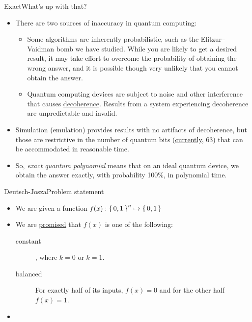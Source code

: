\begin{frame}{Exact}{What's up with that?}
\begin{itemize}[<+->]
    \item There are two sources of inaccuracy in quantum computing:
    \begin{itemize}
        \item Some algorithms are inherently probabilistic, such as the Elitzur--Vaidman bomb we have studied. While you are likely to get a desired result, it may take effort to overcome the probability of obtaining the wrong answer, and it is possible though very unlikely that you cannot obtain the answer.
        \item Quantum computing devices are subject to noise and other interference that causes \href{https://en.wikipedia.org/wiki/Quantum_decoherence}{decoherence}.  Results from a system experiencing decoherence are unpredictable and invalid.
    \end{itemize}
    \item Simulation (emulation) provides results with no artifacts of decoherence, but those are restrictive in the number of quantum bits (\href{https://qiskit.org/documentation/tutorials/simulators/6_extended_stabilizer_tutorial.html}{currently}, 63) that can be accommodated in reasonable time.
    \item So, \emph{exact quantum polynomial} means that on an ideal quantum device, we obtain the answer exactly, with probability 100\%, in polynomial time.
\end{itemize}
\end{frame}

\begin{frame}{Deutsch-Josza}{Problem statement}
\begin{itemize}[<+->]
    \item We are given a function $f(x): \left\{\,0,1\,\right\}^{n}\mapsto \left\{\,0,1\,\right\}$
    \item We are \href{https://en.wikipedia.org/wiki/Promise_problem}{promised} that $f(x)$ is one of the following:
    \begin{description}
        \item[constant]  , where $k=0$ or $k=1$.
        \item[balanced]  For exactly half of its inputs, $f(x) = 0$ and for the other half $f(x) = 1$.
    \end{description}
    \item 
\end{itemize}
\end{frame}

